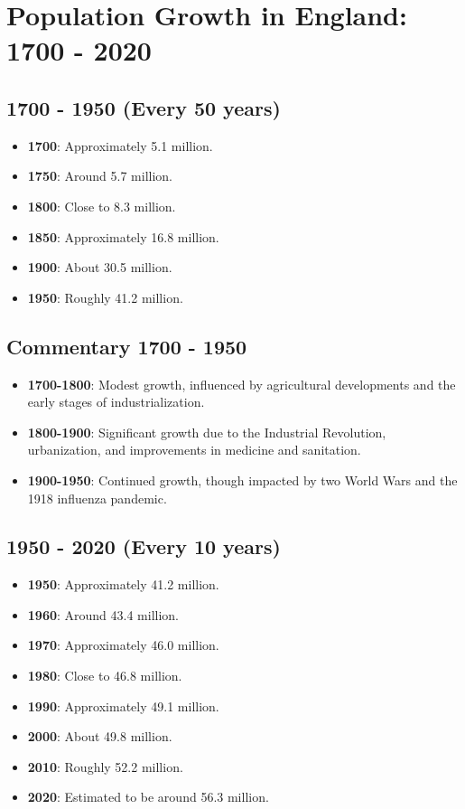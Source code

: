 \section{Population Growth in England: 1700 - 2020}

\subsection*{1700 - 1950 (Every 50 years)}
\begin{itemize}
    \item \textbf{1700}: Approximately 5.1 million.
    \item \textbf{1750}: Around 5.7 million.
    \item \textbf{1800}: Close to 8.3 million.
    \item \textbf{1850}: Approximately 16.8 million.
    \item \textbf{1900}: About 30.5 million.
    \item \textbf{1950}: Roughly 41.2 million.
\end{itemize}

\subsection*{Commentary 1700 - 1950}
\begin{itemize}
    \item \textbf{1700-1800}: Modest growth, influenced by agricultural developments and the early stages of industrialization.
    \item \textbf{1800-1900}: Significant growth due to the Industrial Revolution, urbanization, and improvements in medicine and sanitation.
    \item \textbf{1900-1950}: Continued growth, though impacted by two World Wars and the 1918 influenza pandemic.
\end{itemize}

\subsection*{1950 - 2020 (Every 10 years)}
\begin{itemize}
    \item \textbf{1950}: Approximately 41.2 million.
    \item \textbf{1960}: Around 43.4 million.
    \item \textbf{1970}: Approximately 46.0 million.
    \item \textbf{1980}: Close to 46.8 million.
    \item \textbf{1990}: Approximately 49.1 million.
    \item \textbf{2000}: About 49.8 million.
    \item \textbf{2010}: Roughly 52.2 million.
    \item \textbf{2020}: Estimated to be around 56.3 million.
\end{itemize}

